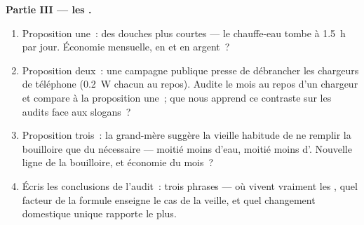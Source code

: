\begin{problem}
\medskip\noindent\textbf{Partie III --- les .}
\begin{enumerate}[resume]
  \item Proposition une~: des douches plus courtes --- le
        chauffe-eau tombe à \qty{1.5}{h} par jour. Économie
        mensuelle, en  et en argent~?
  \item Proposition deux~: une campagne publique presse de
        débrancher les chargeurs de téléphone (\qty{0.2}{W} chacun
        au repos). Audite le mois au repos d'un chargeur et compare
        à la proposition une~; que nous apprend ce contraste sur
        les audits face aux slogans~?
  \item Proposition trois~: la grand-mère suggère la vieille
        habitude de ne remplir la bouilloire que du nécessaire ---
        moitié moins d'eau, moitié moins d'. Nouvelle ligne
        de la bouilloire, et économie du mois~?
  \item Écris les conclusions de l'audit~: trois phrases --- où
        vivent vraiment les , quel facteur de la
        formule enseigne le cas de la veille, et quel changement
        domestique unique rapporte le plus.
\end{enumerate}
\end{problem}
